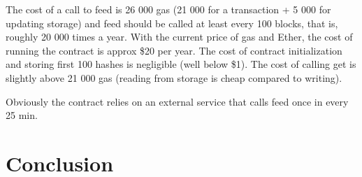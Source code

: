 \documentclass[a4paper]{article}
\begin{document}
    The cost of a call to feed is 26 000 gas (21 000 for a transaction + 5 000 for updating storage) and feed should
    be called at least every 100 blocks, that is, roughly 20 000 times a year. With the current price of gas
    and Ether, the cost of running the contract is approx \$20 per year. The cost of contract initialization and
    storing first 100 hashes is negligible (well below \$1). The cost of calling get is slightly above 21 000 gas
    (reading from storage is cheap compared to writing).

    Obviously the contract relies on an external service that calls feed once in every 25 min.

\section{Conclusion}
\end{document}
